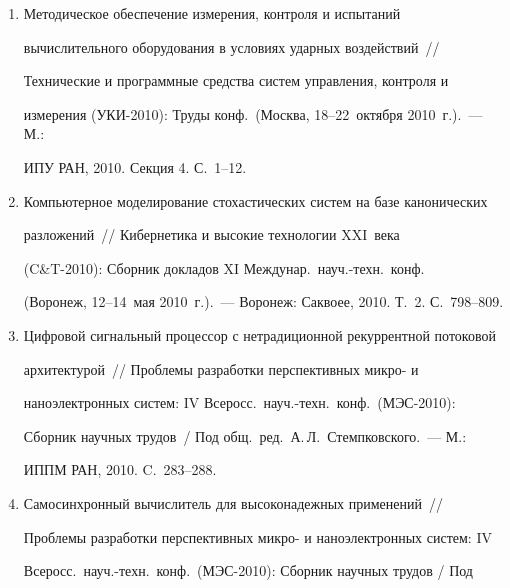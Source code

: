 \begin{enumerate}[1.]
2010~г.).~--- Казань: КГУ, 2010. С.~356--361.


\item {}


Методическое обеспечение измерения, контроля и испытаний 


вычислительного оборудования в условиях ударных воздействий~/\!\!/  


Технические и программные средства сис\-тем управления, контроля и 


измерения (УКИ-2010): Труды конф.\ (Москва, 18--22~октября 2010~г.).~--- М.: 


ИПУ РАН, 2010. Секция 4. С.~1--12.


\item {}


Компьютерное моделирование стохастических сис\-тем на базе канонических 


разложений~/\!\!/  Кибернетика и высокие технологии XXI~века 


(C\&T-2010): Сборник докладов XI Междунар.\ науч.-техн.\ конф.\ 


(Воронеж, 12--14~мая 2010~г.).~--- Воронеж: Саквоее, 2010. Т.~2. С.~798--809.


\item {}


Цифровой сигнальный процессор с нетрадиционной рекуррентной потоковой 


архитектурой~/\!\!/  Проблемы разработки перспективных микро- и 


наноэлектронных сис\-тем: IV Всеросс.\ науч.-техн.\ конф.\ (МЭС-2010): 


Сборник научных трудов~/ Под общ.\ ред.\ А.\,Л.~Стемпковского.~--- М.: 


ИППМ РАН, 2010. C.~283--288.


\item {}


Самосинхронный вычислитель для высоконадежных применений~/\!\!/  


Проблемы разработки перспективных микро- и наноэлектронных сис\-тем: IV 


Всеросс.\ науч.-техн.\ конф.\ (МЭС-2010): Сборник научных трудов / Под 



\end{enumerate}
